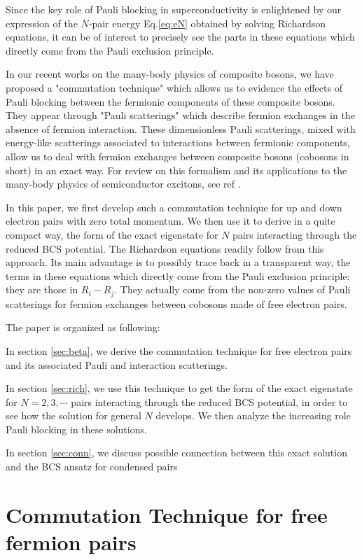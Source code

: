 \documentclass[aps,prb,superscriptaddress,twocolumn]{revtex4}
\begin{document}
Since the key role of Pauli blocking in superconductivity is enlightened by
our expression of the $N$-pair energy Eq.\eqref{eq:eN} obtained by solving
Richardson equations, it can be of interest to precisely see the parts in
these equations which directly come from the Pauli exclusion principle.

In our recent works on the many-body physics of composite bosons, we have
proposed a "commutation technique" which allows us to evidence the effects
of Pauli blocking between the fermionic components of these composite
bosons. They appear through "Pauli scatterings" which describe fermion
exchanges in the absence of fermion interaction. These dimensionless Pauli
scatterings, mixed with energy-like scatterings associated to interactions
between fermionic components, allow us to deal with fermion exchanges
between composite bosons (cobosons in short) in an exact way. For review on
this formalism and its applications to the many-body physics of
semiconductor excitons, see ref \cite%
{CobosonPhysicsReports,CobosonCalculation}.

In this paper, we first develop such a commutation technique for up and down
electron pairs with zero total momentum. We then use it to derive in a quite
compact way, the form of the exact eigenstate for $N$ pairs interacting
through the reduced BCS potential. The Richardson equations readily follow
from this approach. Its main advantage is to possibly trace back in a
transparent way, the terms in these equations which directly come from the
Pauli exclusion principle: they are those in $R_i-R_j$. They actually come
from the non-zero values of Pauli scatterings for fermion exchanges between
cobosons made of free electron pairs.

The paper is organized as following:

In section \ref{sec:beta}, we derive the commutation technique for free
electron pairs and its associated Pauli and interaction scatterings.

In section \ref{sec:rich}, we use this technique to get the form of the
exact eigenstate for $N=2,3,\cdots$ pairs interacting through the reduced
BCS potential, in order to see how the solution for general $N$ develops. We
then analyze the increasing role Pauli blocking in these solutions.

In section \ref{sec:conn}, we discuss possible connection between this exact
solution and the BCS ansatz for condensed pairs

\section{Commutation Technique for free fermion pairs\label{sec:beta}}
\end{document}
